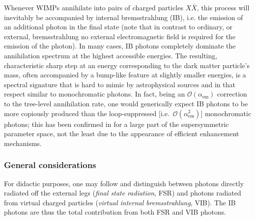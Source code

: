 \documentclass[a4paper,10pt,oneside]{book}
\begin{document}
Whenever WIMPs annihilate into pairs of charged particles $X\bar X$, this process 
will inevitably be accompanied by internal 
bremsstrahlung (IB), i.e. the emission of an additional photon in the final state 
(note that in contrast to ordinary, or external, bremsstrahlung no external 
electromagnetic field is required for the emission of the photon). In many cases, 
IB photons completely dominate the annihilation spectrum at the highest accessible 
energies. The resulting, characteristic sharp step at an energy corresponding to 
the dark matter particle's mass, often accompanied by a bump-like feature at slightly smaller energies, is a spectral signature that is hard to mimic by 
astrophysical sources and in that respect similar to monochromatic photons. 
In fact, being an $\mathcal{O}(\alpha_\mathrm{em})$ correction to the tree-level 
annihilation rate, one would generically expect IB photons to be more copiously 
produced than the loop-suppressed [i.e.~$\mathcal{O}(\alpha_\mathrm{em}^2)$] 
monochromatic photons; this has been confirmed in \cite{Bringmann:2007nk} for a large part 
of the supersymmetric parameter space, not the least due to the appearance of 
efficient enhancement mechanisms. 



\subsubsection{General considerations}


For didactic purposes, one may follow \cite{Bringmann:2007nk} and distinguish between 
photons directly radiated off the external legs (\emph{final state radiation}, FSR) 
and photons radiated from virtual charged particles (\emph{virtual internal 
bremsstrahlung}, VIB). The IB photons are thus  the total contribution from both 
FSR and VIB photons.
\end{document}
